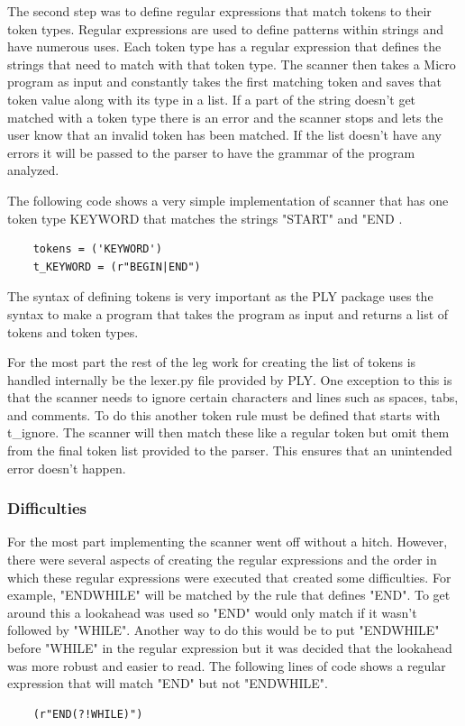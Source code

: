 \documentclass[12pt, oneside]{article}   	%
\begin{document}
The second step was to define regular expressions that match tokens to their token types. Regular expressions are used to define patterns within strings and have numerous uses. Each token type has a regular expression that defines the strings that need to match with that token type. The scanner then takes a Micro program as input and constantly takes
the first matching token and saves that token value along with its type in a list. If a part of the string doesn't get matched with a token type there is an error and the scanner stops and lets the user know that an invalid token has been
matched. If the list doesn't have any errors it will be passed to the parser to have the grammar of the program analyzed. 

The following code shows a very simple implementation of scanner that has one token type KEYWORD that matches the strings "START" and "END .
\begin{lstlisting}
	tokens = ('KEYWORD')
	t_KEYWORD = (r"BEGIN|END")
\end{lstlisting}
The syntax of defining tokens is very important as the PLY package uses the syntax to make a program that takes the program as input and returns a list of tokens and token types.

For the most part the rest of the leg work for creating the list of tokens is handled internally be the lexer.py file provided by PLY. One exception to this is that the scanner needs to ignore certain characters and lines such as spaces, tabs, and comments. To do this another token rule must be defined that starts with t\_ignore. The scanner will then match these like a regular token but omit them from the final token list provided to the parser. This ensures that an unintended error doesn't happen.

\subsubsection{Difficulties}
For the most part implementing the scanner went off without a hitch. However, there were several aspects of creating the regular expressions and the order in which these regular expressions were executed that created some difficulties. For example, "ENDWHILE" will be matched by the rule 
that defines "END". To get around this a lookahead was used so "END" would only match if it wasn't followed by "WHILE". Another way to do this would be to put "ENDWHILE" before "WHILE" in the regular expression but it was decided that the lookahead was more robust and easier to read. The following lines of code  shows a regular expression that will match "END" but not "ENDWHILE".
\begin{lstlisting}
	(r"END(?!WHILE)")
\end{lstlisting}
\end{document}
